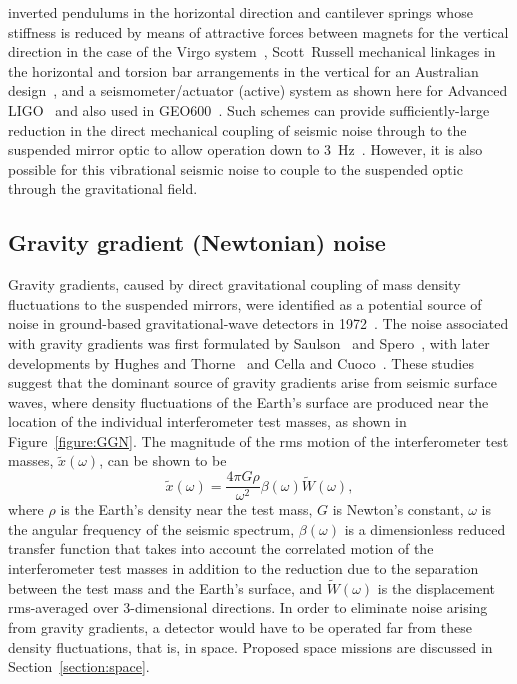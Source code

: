 inverted pendulums in the horizontal direction and cantilever springs whose
stiffness is reduced by means of attractive forces between magnets for the
vertical direction in the case of the Virgo system~\cite{Losurdo},
Scott~Russell mechanical linkages in the horizontal and torsion bar arrangements
in the vertical for an Australian design~\cite{Winterflood}, and a
seismometer/actuator (active) system as shown here for Advanced
LIGO~\cite{Abbott:2002} and also used in GEO600~\cite{Plissi2}.  Such schemes
can provide sufficiently-large reduction in the direct mechanical coupling of
seismic noise through to the suspended mirror optic to allow operation down to
3~Hz~\cite{Braccini:1993,ETweb}. However, it is also possible for this
vibrational seismic noise to couple to the suspended optic through the
gravitational field.


\subsection{Gravity gradient (Newtonian) noise}
\label{subsection:gravitygradient} 

Gravity gradients, caused by direct gravitational coupling of mass density
fluctuations to the suspended mirrors, were identified as a potential source of
noise in ground-based gravitational-wave detectors in 1972~\cite{Weiss}. The
noise associated with gravity gradients was first formulated by
Saulson~\cite{Saulson1} and Spero~\cite{Spero}, with later developments by
Hughes and Thorne~\cite{Thorne:1998} and Cella and Cuoco~\cite{Beccaria}.
These studies suggest that the dominant source of gravity gradients arise from
seismic surface waves, where density fluctuations of the Earth's surface are
produced near the location of the individual interferometer test masses, as
shown in Figure~\ref{figure:GGN}.
The magnitude of the rms motion of the interferometer test masses,
$\tilde{x}(\omega)$, can be shown to be~\cite{Thorne:1998}
\begin{equation}
  \tilde{x}(\omega) = \frac{4 \pi G \rho}{\omega^{2}} \beta(\omega)
\tilde{W}(\omega),
  \label{equation:GGN}
\end{equation}
where $\rho$ is the Earth's density near the test mass, $G$ is
Newton's constant, $\omega$ is the angular frequency of the seismic
spectrum, $\beta(\omega)$ is a dimensionless reduced transfer function
that takes into account the correlated motion of the interferometer
test masses in addition to the reduction due to the separation between
the test mass and the Earth's surface, and $\tilde{W}(\omega)$ is the
displacement rms-averaged over 3-dimensional directions. In order to
eliminate noise arising from gravity gradients, a detector would have
to be operated far from these density fluctuations, that is, in space.
Proposed space missions are discussed in Section~\ref{section:space}.


